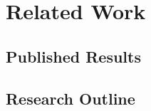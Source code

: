 
\chapter{Related Work}
\label{vol3:chap:related}



\section{Published Results}
\label{vol3:sec:related:results}



\section{Research Outline}
\label{vol3:sec:related:outline}


